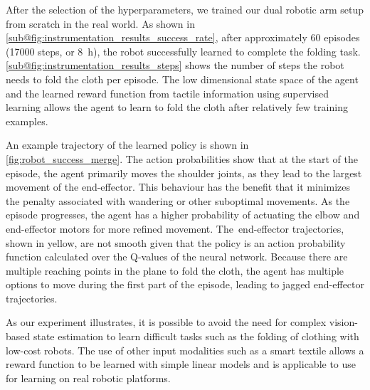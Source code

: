 \documentclass[\home/main.tex]{subfiles}
\begin{document}
After the selection of the hyperparameters, we trained our dual robotic arm setup from scratch in the real world. As shown in \cref{sub@fig:instrumentation_results_success_rate}, after approximately 60 episodes (\qty{17000}{} steps, or \qty{8}{\hour}), the robot successfully learned to complete the folding task. \cref{sub@fig:instrumentation_results_steps} shows the number of steps the robot needs to fold the cloth per episode. The low dimensional state space of the agent and the learned reward function from tactile information using supervised learning allows the agent to learn to fold the cloth after relatively few training examples.

An example trajectory of the learned policy is shown in \cref{fig:robot_success_merge}. The action probabilities show that at the start of the episode, the agent primarily moves the shoulder joints, as they lead to the largest movement of the end-effector. This behaviour has the benefit that it minimizes the penalty associated with wandering or other suboptimal movements. As the episode progresses, the agent has a higher probability of actuating the elbow and end-effector motors for more refined movement. The~end-effector trajectories, shown in yellow, are not smooth given that the policy is an action probability function calculated over the Q-values of the neural network. Because there are multiple reaching points in the plane to fold the cloth, the agent has multiple options to move during the first part of the episode, leading to jagged end-effector trajectories.

As our experiment illustrates, it is possible to avoid the need for complex vision-based state estimation to learn difficult tasks such as the folding of clothing with low-cost robots. The use of other input modalities such as a smart textile allows a reward function to be learned with simple linear models and is applicable to use for learning on real robotic platforms.
\end{document}
